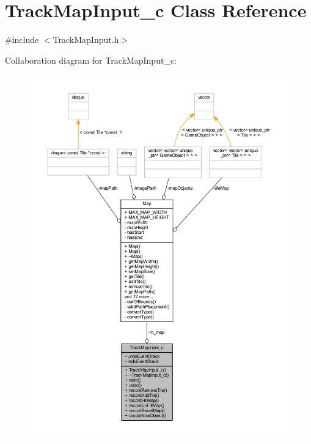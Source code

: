 \hypertarget{class_track_map_input__c}{\section{Track\+Map\+Input\+\_\+c Class Reference}
\label{class_track_map_input__c}
}


{\ttfamily \#include $<$Track\+Map\+Input.\+h$>$}



Collaboration diagram for Track\+Map\+Input\+\_\+c\+:
\nopagebreak
\begin{figure}[H]
\begin{center}
\leavevmode
\includegraphics[width=350pt]{class_track_map_input__c__coll__graph}
\end{center}
\end{figure}
